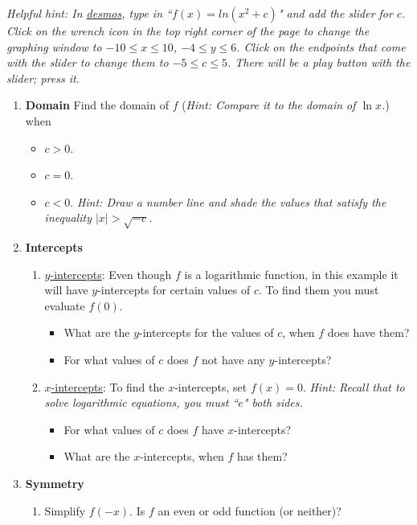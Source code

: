 \documentclass[%
]{article}
\begin{document}
\begin{enumerate}
\vspace{0.25pc}
\textit{Helpful hint:  In \url{desmos}, type in ``$f(x)=ln(x^2+c)$" and add the slider for $c$.  Click on the wrench icon in the top right corner of the page to change the graphing window to $-10\leq x\leq 10$, $-4\leq y\leq 6$.  Click on the endpoints that come with the slider to change them to $-5\leq c\leq 5$.  There will be a play button with the slider; press it.}

	\begin{enumerate}
	\item \textbf{Domain} Find the domain of $f$ (\textit{Hint: Compare it to the domain of $\ln x$.}) when
		\begin{itemize}
			\item $c>0$.
			\item $c=0$.
			\item $c<0$.  \textit{Hint: Draw a number line and shade the values that satisfy the inequality $|x|>\sqrt{-c}$.}			
		\end{itemize}
	\item \textbf{Intercepts} \begin{enumerate}
		\item \underline{$y$-intercepts}: Even though $f$ is a logarithmic function, in this example it will have $y$-intercepts for certain values of $c$.  To find them you must evaluate $f(0)$.
			\begin{itemize}
			\item What are the $y$-intercepts for the values of $c$, when $f$ does have them?
			\item For what values of $c$ does $f$ not have any $y$-intercepts?
			\end{itemize}
		\item \underline{$x$-intercepts}: To find the $x$-intercepts, set $f(x)=0$.  \textit{Hint: Recall that to solve logarithmic equations, you must ``$e$" both sides.}
			\begin{itemize}
			\item For what values of $c$ does $f$ have $x$-intercepts?
			\item What are the $x$-intercepts, when $f$ has them?
			\end{itemize}
		\end{enumerate}
	\item \textbf{Symmetry} \begin{enumerate}
		\item Simplify $f(-x)$.  Is $f$ an even or odd function (or neither)?

\end{enumerate}
\end{enumerate}
\end{enumerate}
\end{document}
